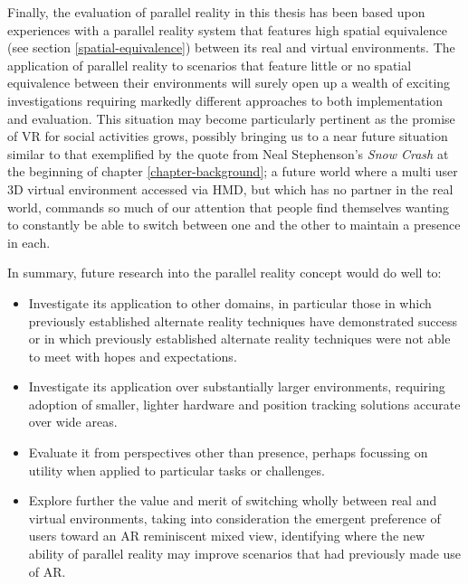 Finally, the evaluation of parallel reality in this thesis has been based upon experiences with a parallel reality system that features high spatial equivalence (see section \ref{spatial-equivalence}) between its real and virtual environments. The application of parallel reality to scenarios that feature little or no spatial equivalence between their environments will surely open up a wealth of exciting investigations requiring markedly different approaches to both implementation and evaluation. This situation may become particularly pertinent as the promise of VR for social activities grows, possibly bringing us to a near future situation similar to that exemplified by the quote from Neal Stephenson's \textit{Snow Crash} at the beginning of chapter \ref{chapter-background}; a future world where a multi user 3D virtual environment accessed via HMD, but which has no partner in the real world, commands so much of our attention that people find themselves wanting to constantly be able to switch between one and the other to maintain a presence in each.

In summary, future research into the parallel reality concept would do well to:
\begin{itemize}
	\item Investigate its application to other domains, in particular those in which previously established alternate reality techniques have demonstrated success or in which previously established alternate reality techniques were not able to meet with hopes and expectations.

	\item Investigate its application over substantially larger environments, requiring adoption of smaller, lighter hardware and position tracking solutions accurate over wide areas.

	\item Evaluate it from perspectives other than presence, perhaps focussing on utility when applied to particular tasks or challenges.

	\item Explore further the value and merit of switching wholly between real and virtual environments, taking into consideration the emergent preference of users toward an AR reminiscent mixed view, identifying where the new ability of parallel reality may improve scenarios that had previously made use of AR.
\end{itemize}

